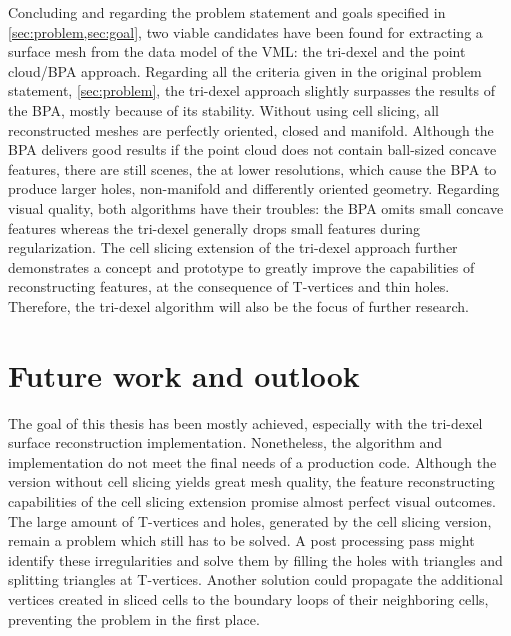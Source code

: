 Concluding and regarding the problem statement and goals specified in \cref{sec:problem,sec:goal}, two viable candidates have been found for extracting a surface mesh from the data model of the VML: the tri-dexel and the point cloud/BPA approach.
Regarding all the criteria given in the original problem statement, \cf \cref{sec:problem}, the tri-dexel approach slightly surpasses the results of the BPA, mostly because of its stability.
Without using cell slicing, all reconstructed meshes are perfectly oriented, closed and manifold.
Although the BPA delivers good results if the point cloud does not contain ball-sized concave features, there are still scenes, \cf the \turbine at lower resolutions, which cause the BPA to produce larger holes, non-manifold and differently oriented geometry.
Regarding visual quality, both algorithms have their troubles: the BPA omits small concave features whereas the tri-dexel generally drops small features during regularization.
The cell slicing extension of the tri-dexel approach further demonstrates a concept and prototype to greatly improve the capabilities of reconstructing features, at the consequence of T-vertices and thin holes.
Therefore, the tri-dexel algorithm will also be the focus of further research.


\section{Future work and outlook}
\label{sec:outlook}

The goal of this thesis has been mostly achieved, especially with the tri-dexel surface reconstruction implementation.
Nonetheless, the algorithm and implementation do not meet the final needs of a production code.
Although the version without cell slicing yields great mesh quality, the feature reconstructing capabilities of the cell slicing extension promise almost perfect visual outcomes.
The large amount of T-vertices and holes, generated by the cell slicing version, remain a problem which still has to be solved.
A post processing pass might identify these irregularities and solve them by filling the holes with triangles and splitting triangles at T-vertices.
Another solution could propagate the additional vertices created in sliced cells to the boundary loops of their neighboring cells, preventing the problem in the first place.

